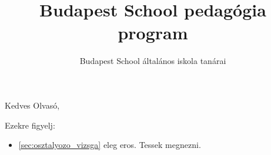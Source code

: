 \documentclass[magyar,12pt,a4paper,draft]{report}
\begin{document}
\newif\ifkerettanterv
\kerettantervfalse

\title{Budapest School pedagógia program}
\author{Budapest School általános iskola tanárai}
\maketitle

Kedves Olvasó,

Ezekre figyelj:
\begin{itemize}
  \item \ref{sec:osztalyozo_vizsga} eleg eros. Tessek megnezni.
  
\end{itemize}

\listoftodos[Notes]

\tableofcontents
\newpage
 


{}
\label{sec:bibliographyk}

\end{document}
